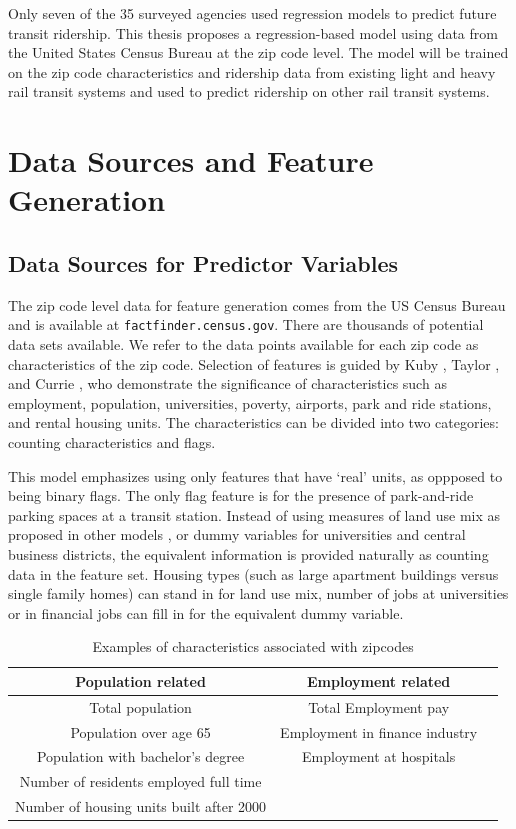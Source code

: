 \documentclass[11pt]{article}
\begin{document}
Only seven of the 35 surveyed agencies used regression models to predict future transit ridership. This thesis proposes a regression-based model using data from the United States Census Bureau at the zip code level. The model will be trained on the zip code characteristics and ridership data from existing light and heavy rail transit systems and used to predict ridership on other rail transit systems.  

\section{Data Sources and Feature Generation}

\subsection{Data Sources for Predictor Variables}

The zip code level data for feature generation comes from the US Census Bureau and is available at \texttt{factfinder.census.gov}. There are thousands of potential data sets available. We refer to the data points available for each zip code as characteristics of the zip code. Selection of features is guided by Kuby \cite{Kuby2004}, Taylor \cite{Taylor2008}, and Currie \cite{Currie2011}, who demonstrate the significance of characteristics such as employment, population, universities, poverty, airports, park and ride stations, and rental housing units. The characteristics can be divided into two categories: counting characteristics and flags. 

This model emphasizes using only features that have `real' units, as oppposed to being binary flags. The only flag feature is for the presence of park-and-ride parking spaces at a transit station. Instead of using measures of land use mix as proposed in other models \cite{Durning2015, Gutierrez2011}, or dummy variables for universities and central business districts, the equivalent information is provided naturally as counting data in the feature set. Housing types (such as large apartment buildings versus single family homes) can stand in for land use mix, number of jobs at universities or in financial jobs can fill in for the equivalent dummy variable. 

\begin{table}[H]
\centering\begingroup\fontsize{10}{10}\selectfont
\begin{tabular}{ccc}
\toprule \textbf{Population related}&\textbf{Employment related} \\ 
\midrule Total population&Total Employment pay\\
Population over age 65& Employment in finance industry\\
Population with bachelor's degree& Employment at hospitals\\
Number of residents employed full time&\\
Number of housing units built after 2000&\\
\bottomrule
\end{tabular}\endgroup
\caption{Examples of characteristics associated with zipcodes}\label{tab:char}
\end{table}
\end{document}
